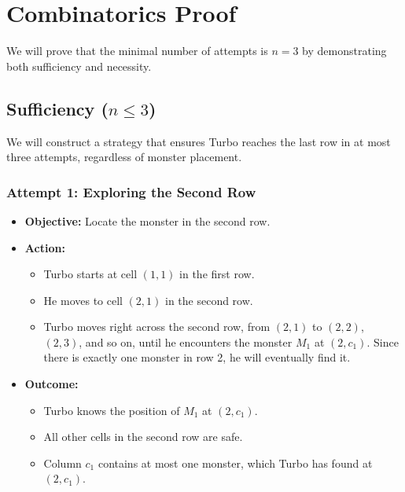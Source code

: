 \section{Combinatorics Proof}
\label{appendix:K}

\begin{tcolorbox}[enhanced, breakable, rounded corners,
    colback=gray!5!white, colframe=gray!75!black,
    colbacktitle=gray!85!black, fonttitle=\bfseries, coltitle=white, title=2024 IMO Problem 5]

\setlength{\parskip}{1em}
We will prove that the minimal number of attempts is $ n = 3 $ by demonstrating both sufficiency and necessity.


\subsection*{Sufficiency ($ n \leq 3 $)}

We will construct a strategy that ensures Turbo reaches the last row in at most three attempts, regardless of monster placement.

\subsubsection*{Attempt 1: Exploring the Second Row}

\begin{itemize}
    \item \textbf{Objective:} Locate the monster in the second row.
    \item \textbf{Action:}
    \begin{itemize}
        \item Turbo starts at cell $ (1,1) $ in the first row.
        \item He moves to cell $ (2,1) $ in the second row.
        \item Turbo moves right across the second row, from $ (2,1) $ to $ (2,2) $, $ (2,3) $, and so on, until he encounters the monster $ M_1 $ at $ (2, c_1) $. Since there is exactly one monster in row 2, he will eventually find it.
    \end{itemize}
    \item \textbf{Outcome:}
    \begin{itemize}
        \item Turbo knows the position of $ M_1 $ at $ (2, c_1) $.
        \item All other cells in the second row are safe.
        \item Column $ c_1 $ contains at most one monster, which Turbo has found at $ (2, c_1) $.
    \end{itemize}
\end{itemize}


\end{tcolorbox}
